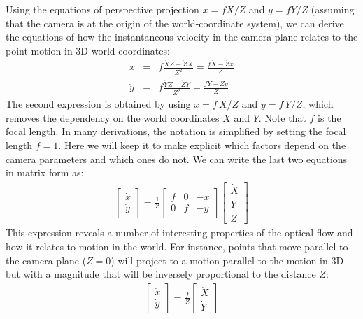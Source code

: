 Using the equations of perspective projection $x=f X/Z$ and $y=f Y/Z$ (assuming that the camera is at the origin of the world-coordinate system), we can derive the equations of how the instantaneous velocity in the camera plane relates to the point motion in 3D world coordinates:
\begin{eqnarray}
\dot{x} & = & f \frac{\dot{X} Z - \dot{Z} X}{Z^2} = \frac{f \dot{X} - \dot{Z} x}{Z}\\
\dot{y} & = & f \frac{\dot{Y} Z - \dot{Z} Y}{Z^2} = \frac{f \dot{Y} - \dot{Z} y}{Z} 
\end{eqnarray}
The second expression is obtained by using $x=f \, X/Z$ and $y=f \, Y/Z$, which removes the dependency on the world coordinates $X$ and $Y$. Note that $f$ is the focal length. In many derivations, the notation is simplified by setting the focal length $f=1$. Here we will keep it to make explicit which factors depend on the camera parameters and which ones do not. 
We can write the last two equations in matrix form as:
\begin{align}
\begin{bmatrix}
\dot{x} \\
\dot{y}
\end{bmatrix}
= \frac{1}{Z}
\begin{bmatrix}
f & 0 & -x \\
0 & f & -y  
\end{bmatrix}
\begin{bmatrix}
\dot{X} \\
\dot{Y} \\
\dot{Z}
\end{bmatrix}
\label{eq:motionprojection}
\end{align}
This expression reveals a number of interesting properties of the optical flow and how it relates to motion in the world. For instance, points that move parallel to the camera plane ($\dot{Z} = 0$) will project to a motion parallel to the motion in 3D but with a magnitude that will be inversely proportional to the distance $Z$:
\begin{align}
\begin{bmatrix}
\dot{x} \\
\dot{y}
\end{bmatrix}
= \frac{f}{Z}
\begin{bmatrix}
\dot{X} \\
\dot{Y}
\end{bmatrix}
\label{eq:parallelmotion}
\end{align}

